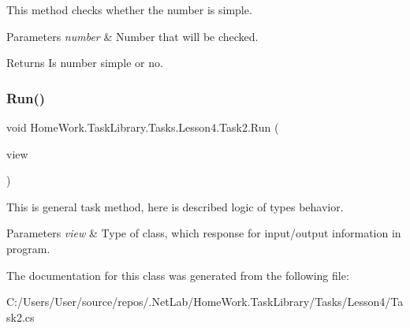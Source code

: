 This method checks whether the number is simple. 


\begin{DoxyParams}{Parameters}
{\em number} & Number that will be checked.\\
\hline
\end{DoxyParams}
\begin{DoxyReturn}{Returns}
Is number simple or no.
\end{DoxyReturn}
\mbox{\label{class_home_work_1_1_task_library_1_1_tasks_1_1_lesson4_1_1_task2_a3f9750bb2f161d0a9e16a96087c868da}} 
\subsubsection{\texorpdfstring{Run()}{Run()}}
{\footnotesize\ttfamily void Home\+Work.\+Task\+Library.\+Tasks.\+Lesson4.\+Task2.\+Run (\begin{DoxyParamCaption}\item[{I\+Information}]{view }\end{DoxyParamCaption})}



This is general task method, here is described logic of types behavior. 


\begin{DoxyParams}{Parameters}
{\em view} & Type of class, which response for input/output information in program.\\
\hline
\end{DoxyParams}


The documentation for this class was generated from the following file\+:\begin{DoxyCompactItemize}
\item 
C\+:/\+Users/\+User/source/repos/.\+Net\+Lab/\+Home\+Work.\+Task\+Library/\+Tasks/\+Lesson4/Task2.\+cs\end{DoxyCompactItemize}
